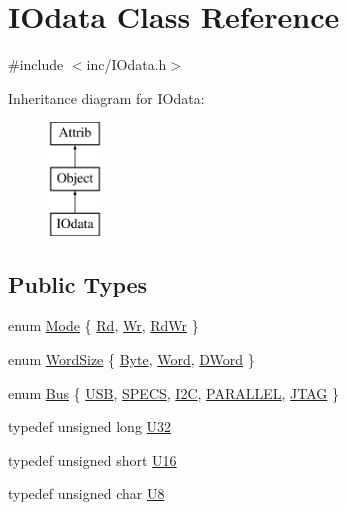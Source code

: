 \hypertarget{classIOdata}{}\section{I\+Odata Class Reference}
\label{classIOdata}


{\ttfamily \#include $<$inc/\+I\+Odata.\+h$>$}

Inheritance diagram for I\+Odata\+:\begin{figure}[H]
\begin{center}
\leavevmode
\includegraphics[height=3.000000cm]{classIOdata}
\end{center}
\end{figure}
\subsection*{Public Types}
\begin{DoxyCompactItemize}
\item 
enum \hyperlink{classIOdata_a044e9a4a0c6d25a43ebfe29c4fa4f1e5}{Mode} \{ \hyperlink{classIOdata_a044e9a4a0c6d25a43ebfe29c4fa4f1e5a9ac1bef9c44dd3f63df0b64646129e97}{Rd}, 
\hyperlink{classIOdata_a044e9a4a0c6d25a43ebfe29c4fa4f1e5a019388bd87f0ec039a78e7ac5cb60a81}{Wr}, 
\hyperlink{classIOdata_a044e9a4a0c6d25a43ebfe29c4fa4f1e5ae0f5414225eec903b44306912160c754}{Rd\+Wr}
 \}
\item 
enum \hyperlink{classIOdata_a37c53ebf4bf8d866aac8af572962a84c}{Word\+Size} \{ \hyperlink{classIOdata_a37c53ebf4bf8d866aac8af572962a84ca00156611f08eeb1b5d361de809dafb8e}{Byte}, 
\hyperlink{classIOdata_a37c53ebf4bf8d866aac8af572962a84ca7d603e9c9a55e3c8dffa4bd8e3dca491}{Word}, 
\hyperlink{classIOdata_a37c53ebf4bf8d866aac8af572962a84ca458da82d97e3ea9715c34b558c34f734}{D\+Word}
 \}
\item 
enum \hyperlink{classIOdata_a99aa7bed39364c4359ab8a7596bc013c}{Bus} \{ \newline
\hyperlink{classIOdata_a99aa7bed39364c4359ab8a7596bc013cabd27b3ded09d67a97f98b5004101856f}{U\+SB}, 
\hyperlink{classIOdata_a99aa7bed39364c4359ab8a7596bc013caf9005892b62633a3e9f3456ef11c8991}{S\+P\+E\+CS}, 
\hyperlink{classIOdata_a99aa7bed39364c4359ab8a7596bc013ca68cf1532718ac977427bacd1a7e0bc32}{I2C}, 
\hyperlink{classIOdata_a99aa7bed39364c4359ab8a7596bc013caf68d3c4cdd5e3c21501655358370b460}{P\+A\+R\+A\+L\+L\+EL}, 
\newline
\hyperlink{classIOdata_a99aa7bed39364c4359ab8a7596bc013ca185cc1d64a0173fc7da76513e2fb5642}{J\+T\+AG}
 \}
\item 
typedef unsigned long \hyperlink{classIOdata_a96fb57f5fcd87b708743abd3c86a5198}{U32}
\item 
typedef unsigned short \hyperlink{classIOdata_a1eb45b348534a7c19a4a99b746e693ff}{U16}
\item 
typedef unsigned char \hyperlink{classIOdata_a18d1354b7cdaf0f8a8001fdbb3ced418}{U8}
\end{DoxyCompactItemize}
